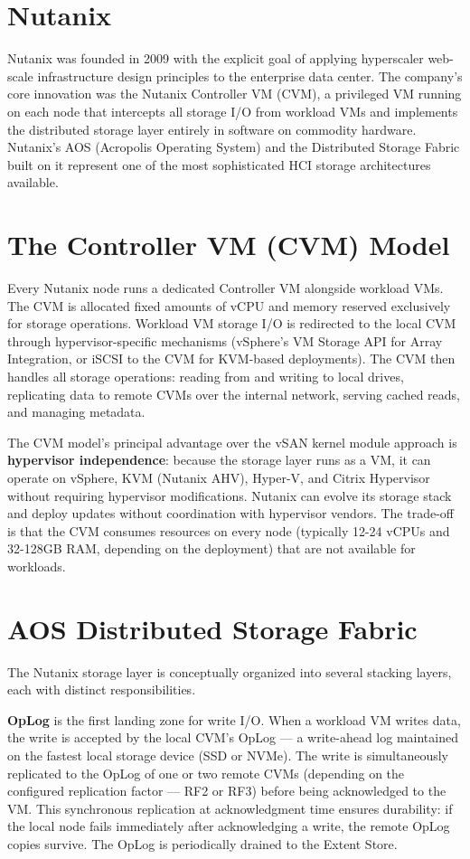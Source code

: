 \section{Nutanix}
Nutanix was founded in 2009 with the explicit goal of applying hyperscaler web-scale infrastructure design principles to the enterprise data center. The company's core innovation was the Nutanix Controller VM (CVM), a privileged VM running on each node that intercepts all storage I/O from workload VMs and implements the distributed storage layer entirely in software on commodity hardware. Nutanix's AOS (Acropolis Operating System) and the Distributed Storage Fabric built on it represent one of the most sophisticated HCI storage architectures available.

\section{The Controller VM (CVM) Model}
Every Nutanix node runs a dedicated Controller VM alongside workload VMs. The CVM is allocated fixed amounts of vCPU and memory reserved exclusively for storage operations. Workload VM storage I/O is redirected to the local CVM through hypervisor-specific mechanisms (vSphere's VM Storage API for Array Integration, or iSCSI to the CVM for KVM-based deployments). The CVM then handles all storage operations: reading from and writing to local drives, replicating data to remote CVMs over the internal network, serving cached reads, and managing metadata.

The CVM model's principal advantage over the vSAN kernel module approach is \textbf{hypervisor independence}: because the storage layer runs as a VM, it can operate on vSphere, KVM (Nutanix AHV), Hyper-V, and Citrix Hypervisor without requiring hypervisor modifications. Nutanix can evolve its storage stack and deploy updates without coordination with hypervisor vendors. The trade-off is that the CVM consumes resources on every node (typically 12-24 vCPUs and 32-128GB RAM, depending on the deployment) that are not available for workloads.

\section{AOS Distributed Storage Fabric}
The Nutanix storage layer is conceptually organized into several stacking layers, each with distinct responsibilities.

\textbf{OpLog} is the first landing zone for write I/O. When a workload VM writes data, the write is accepted by the local CVM's OpLog --- a write-ahead log maintained on the fastest local storage device (SSD or NVMe). The write is simultaneously replicated to the OpLog of one or two remote CVMs (depending on the configured replication factor --- RF2 or RF3) before being acknowledged to the VM. This synchronous replication at acknowledgment time ensures durability: if the local node fails immediately after acknowledging a write, the remote OpLog copies survive. The OpLog is periodically drained to the Extent Store.

